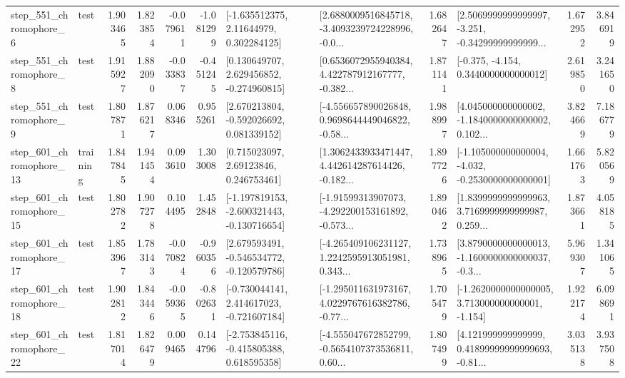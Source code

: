 \begin{tabular}{llrrrrllrlrr}
   step\_551\_chromophore\_6 &      test &      1.903465 &    1.823854 &     -0.079611 & -1.081299 &     [-1.635512375, 2.11644979, 0.302284125] &  [2.6880009516845718, -3.4093239724228996, -0.0... &       1.682647 &  [2.5069999999999997, -3.251, -0.34299999999999... &            1.672952 &          3.846919 \\
   step\_551\_chromophore\_8 &      test &      1.915927 &    1.882090 &     -0.033837 & -0.451245 &    [0.130649707, 2.629456852, -0.274960815] &  [0.6536072955940384, 4.422787912167777, -0.382... &       1.871141 &               [-0.375, -4.154, 0.3440000000000012] &            2.619850 &          3.241650 \\
   step\_551\_chromophore\_9 &      test &      1.807871 &    1.876217 &      0.068346 &  0.955261 &    [2.670213804, -0.592026692, 0.081339152] &  [-4.556657890026848, 0.9698644449046822, -0.58... &       1.988997 &  [4.045000000000002, -1.1840000000000002, 0.102... &            3.824669 &          7.186779 \\
  step\_601\_chromophore\_13 &  training &      1.847845 &    1.941454 &      0.093610 &  1.303008 &      [0.715023097, 2.69123846, 0.246753461] &  [1.3062433933471447, 4.442614287614426, -0.182... &       1.897726 &  [-1.105000000000004, -4.032, -0.2530000000000001] &            1.661763 &          5.820569 \\
  step\_601\_chromophore\_15 &      test &      1.802782 &    1.907278 &      0.104495 &  1.452848 &  [-1.197819153, -2.600321443, -0.130716654] &  [-1.91599313907073, -4.292200153161892, -0.573... &       1.890462 &  [1.8399999999999963, 3.7169999999999987, 0.259... &            1.873661 &          4.058185 \\
  step\_601\_chromophore\_17 &      test &      1.853967 &    1.783143 &     -0.070824 & -0.960356 &   [2.679593491, -0.546534772, -0.120579786] &  [-4.265409106231127, 1.2242595913051981, 0.343... &       1.738965 &  [3.8790000000000013, -1.1600000000000037, -0.3... &            5.969307 &          1.341065 \\
  step\_601\_chromophore\_18 &      test &      1.902812 &    1.843446 &     -0.059365 & -0.802631 &   [-0.730044141, 2.414617023, -0.721607184] &  [-1.295011631973167, 4.0229767616382786, -0.77... &       1.705479 &   [-1.2620000000000005, 3.713000000000001, -1.154] &            1.922174 &          6.098691 \\
  step\_601\_chromophore\_22 &      test &      1.817014 &    1.826479 &      0.009465 &  0.144796 &   [-2.753845116, -0.415805388, 0.618595358] &  [-4.555047672852799, -0.5654107373536811, 0.60... &       1.807499 &  [4.121999999999999, 0.41899999999999693, -0.81... &            3.035138 &          3.937508 \\

\end{tabular}
